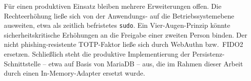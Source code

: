 \documentclass[11pt,a4paper]{article}
\begin{document}
Für einen produktiven Einsatz bleiben mehrere Erweiterungen offen. Die
Rechteerhöhung ließe sich von der Anwendungs- auf die Betriebssystemebene
ausweiten, etwa als zeitlich befristetes \texttt{sudo}. Ein Vier-Augen-Prinzip
könnte sicherheitskritische Erhöhungen an die Freigabe einer zweiten Person
binden. Der nicht phishing-resistente TOTP-Faktor ließe sich durch WebAuthn
bzw.\ FIDO2 ersetzen. Schließlich steht die produktive Implementierung der
Persistenz-Schnittstelle -- etwa auf Basis von MariaDB -- aus, die im Rahmen
dieser Arbeit durch einen In-Memory-Adapter ersetzt wurde.
\end{document}

